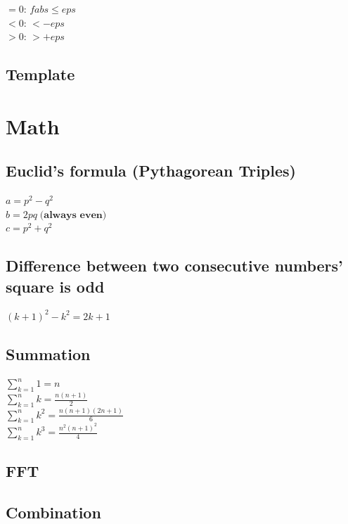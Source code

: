 \documentclass[10pt,oneside]{article}
\begin{document}
\begin{landscape}
\begin{multicols}{2}
$=0$: $fabs \leq eps$\\
$<0$: $ < -eps$\\
$>0$: $ > +eps$

\subsection{Template}


\section{Math}

\subsection{Euclid's formula (Pythagorean Triples)}

$a = p^2 - q^2 $\\
$b = 2pq \; \textbf{(always even)}$ \\
$c = p^2 + q^2$\\

\subsection{Difference between two consecutive numbers' square is odd}

$(k + 1)^2 - k^2 = 2k + 1$

\subsection{Summation}

$\sum_{k=1}^{n} 1= n$\\
$\sum_{k=1}^{n} k= \frac{n(n+1)}{2}$\\
$\sum_{k=1}^{n} k^2= \frac{n(n+1)(2n+1)}{6}$\\
$\sum_{k=1}^{n} k^3= \frac{n^2(n+1)^2}{4}$\\

\subsection{FFT}

\subsection{Combination}


\end{multicols}
\end{landscape}
\end{document}
